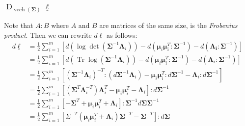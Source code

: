 \documentclass[11pt]{article}
\DeclareMathOperator{\Tr}{Tr}
\newcommand{\bs}{\boldsymbol}
\newcommand{\opn}{\operatorname}
\begin{document}
\subsubsection{$\opn{D}_{\opn{vech}\left(\bs{\Sigma} \right)} \underline{\ell} $}
Note that $A:B$ where $A$ and $B$ are matrices of the same size, is the \emph{Frobenius product}. Then we can rewrite $d\underline{\ell}$ as follows:
\begin{align}
  d\underline{\ell} &= \frac{1}{2}\sum_{i=1}^{m} \left[d \left(\log \det \left(\bs{\Sigma}^{-1}\bs{\Lambda}_{i} \right) \right) -d \left(\bs{\mu}_{i}\bs{\mu}_{i}^{T}:\bs{\Sigma}^{-1} \right) - d \left(\bs{\Lambda_{i}}:\bs{\Sigma}^{-1} \right) \right]\\
  &= \frac{1}{2}\sum_{i=1}^{m} \left[d\left(\Tr \log \left(\bs{\Sigma}^{-1}\bs{\Lambda}_{i} \right) \right) - d\left(\bs{\mu}_{i}\bs{\mu}_{i}^{T}: \bs{\Sigma}^{-1}\right) - d \left(\bs{\Lambda}_{i}:\bs{\Sigma}^{-1} \right) \right]\\
  &= \frac{1}{2}\sum_{i=1}^{m}\left[\left(\bs{\Sigma}^{-1}\bs{\Lambda}_{i} \right)^{-T}: \left(d\bs{\Sigma}^{-1}\bs{\Lambda}_{i} \right) - \bs{\mu}_{i}\bs{\mu}_{i}^{T}:d\bs{\Sigma}^{-1} - \bs{\Lambda}_{i}:d\bs{\Sigma}^{-1} \right]\\
  &= \frac{1}{2}\sum_{i=1}^{m}\left[\left( \bs{\Sigma}^{T}\bs{\Lambda}_{i}^{-T}\right)\bs{\Lambda}_{i}^{T} - \bs{\mu}_{i}\bs{\mu}_{i}^{T} - \bs{\Lambda}_{i} \right] : d\bs{\Sigma}^{-1}\\
  &= \frac{1}{2}\sum_{i=1}^{m}\left[-\bs{\Sigma}^{T} + \bs{\mu}_{i}\bs{\mu}_{i}^{T} + \bs{\Lambda}_{i} \right]:\bs{\Sigma}^{-1} d \bs{\Sigma} \bs{\Sigma}^{-1}\\
  &= \frac{1}{2}\sum_{i=1}^{m} \left[\Sigma^{-T}\left(\bs{\mu}_{i}\bs{\mu}_{i}^{T} + \bs{\Lambda}_{i} \right)\bs{\Sigma}^{-T} - \bs{\Sigma}^{-T} \right]:d\bs{\Sigma}
\end{align}
\end{document}
